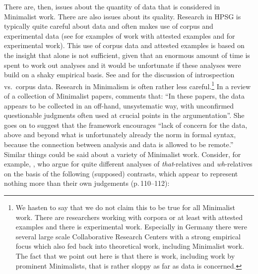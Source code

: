 \documentclass[output=paper]{langsci/langscibook}
\begin{document}
There are, then, issues about the quantity of data that is considered in Minimalist work. There are
also issues about its quality. Research in HPSG is typically quite careful about data and often
makes use of corpus and experimental data (see \citealt{AA2017a-u,Mueller99a,Mueller2002b,BC2010a,MBC2012a}
for examples of work with attested examples and for experimental work). This use of corpus data and
attested examples is based on the insight that  alone is not sufficient, given that an
enormous amount of time is spent to work out analyses and it would be unfortunate if these analyses
were build on a shaky empirical basis. See  and  for the
discussion of introspection vs.\ corpus data.
Research in Minimalism is often rather less
careful.\footnote{
 We hasten to say that we do not claim this to be true for all Minimalist work. There are
 researchers working with corpora or at least with attested examples \citep{Wurmbrand2003a} and
 there is experimental work. Especially in Germany there were several large scale Collaborative
 Research Centers with a strong empirical focus which also fed back into theoretical work, including
 Minimalist work. The fact that we point out here is that there is work, including work
 by prominent Minimalists, that is rather sloppy as far as data is concerned.%
} In a review of a collection of Minimalist papers, \citet[434]{Bender2002a} comments that: ``In
these papers, the data appears to be collected in an off-hand, unsystematic way, with unconfirmed
questionable judgments often used at crucial points in the argumentation''. She goes on to suggest
that the framework encourages ``lack of concern for the data, above and beyond what is unfortunately
already the norm in formal syntax, because the connection between analysis and data is allowed to be
remote.'' Similar things could be said about a variety of Minimalist work. Consider, for example,
\citet{AounLi.2003}, who argue for quite different analyses of \textit{that}-relatives and
\textit{wh}-relatives on the basis of the following (supposed) contrasts, which appear to represent
nothing more than their own judgements (p.\,110--112):
\eal
{}
\label{ex:min-headway-that}
\label{ex:min-headway-which}
\zl
\eal
{}
\label{ex:min-admire-that}
\label{ex:min-admire-which} 
\end{document}
